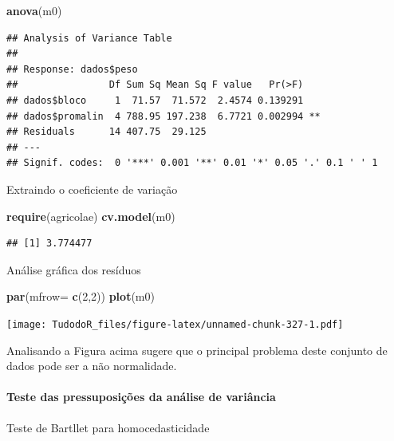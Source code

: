 \documentclass[
]{book}
\newenvironment{Shaded}{\begin{snugshade}}{\end{snugshade}}
\newcommand{\DataTypeTok}[1]{\textcolor[rgb]{0.13,0.29,0.53}{#1}}
\newcommand{\DecValTok}[1]{\textcolor[rgb]{0.00,0.00,0.81}{#1}}
\newcommand{\KeywordTok}[1]{\textcolor[rgb]{0.13,0.29,0.53}{\textbf{#1}}}
\newcommand{\NormalTok}[1]{#1}
\begin{document}
\begin{Shaded}
\begin{Highlighting}[]
\KeywordTok{anova}\NormalTok{(m0)}
\end{Highlighting}
\end{Shaded}

\begin{verbatim}
## Analysis of Variance Table
## 
## Response: dados$peso
##                Df Sum Sq Mean Sq F value   Pr(>F)   
## dados$bloco     1  71.57  71.572  2.4574 0.139291   
## dados$promalin  4 788.95 197.238  6.7721 0.002994 **
## Residuals      14 407.75  29.125                    
## ---
## Signif. codes:  0 '***' 0.001 '**' 0.01 '*' 0.05 '.' 0.1 ' ' 1
\end{verbatim}

Extraindo o coeficiente de variação

\begin{Shaded}
\begin{Highlighting}[]
\KeywordTok{require}\NormalTok{(agricolae)}
\KeywordTok{cv.model}\NormalTok{(m0)}
\end{Highlighting}
\end{Shaded}

\begin{verbatim}
## [1] 3.774477
\end{verbatim}

Análise gráfica dos resíduos

\begin{Shaded}
\begin{Highlighting}[]
\KeywordTok{par}\NormalTok{(}\DataTypeTok{mfrow=} \KeywordTok{c}\NormalTok{(}\DecValTok{2}\NormalTok{,}\DecValTok{2}\NormalTok{))}
\KeywordTok{plot}\NormalTok{(m0)}
\end{Highlighting}
\end{Shaded}

\texttt{[image: TudodoR\_files/figure-latex/unnamed-chunk-327-1.pdf]}

Analisando a Figura acima sugere que o principal problema deste conjunto de dados pode ser a não normalidade.

\hypertarget{teste-das-pressuposiuxe7uxf5es-da-anuxe1lise-de-variuxe2ncia}{%
\paragraph{Teste das pressuposições da análise de variância}\label{teste-das-pressuposiuxe7uxf5es-da-anuxe1lise-de-variuxe2ncia}}

Teste de Bartllet para homocedasticidade
\end{document}

